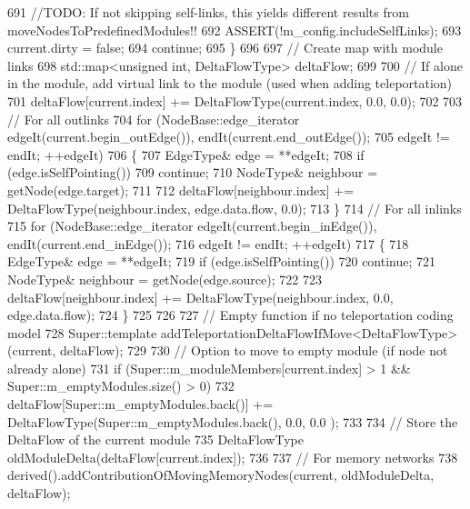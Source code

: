\begin{DoxyCode}
691             \textcolor{comment}{//TODO: If not skipping self-links, this yields different results from
       moveNodesToPredefinedModules!!}
692             ASSERT(!m\_config.includeSelfLinks);
693             current.dirty = \textcolor{keyword}{false};
694             \textcolor{keywordflow}{continue};
695         \}
696 
697         \textcolor{comment}{// Create map with module links}
698         std::map<unsigned int, DeltaFlowType> deltaFlow;
699 
700         \textcolor{comment}{// If alone in the module, add virtual link to the module (used when adding teleportation)}
701         deltaFlow[current.index] += DeltaFlowType(current.index, 0.0, 0.0);
702 
703         \textcolor{comment}{// For all outlinks}
704         \textcolor{keywordflow}{for} (NodeBase::edge\_iterator edgeIt(current.begin\_outEdge()), endIt(current.end\_outEdge());
705                 edgeIt != endIt; ++edgeIt)
706         \{
707             EdgeType& edge = **edgeIt;
708             \textcolor{keywordflow}{if} (edge.isSelfPointing())
709                 \textcolor{keywordflow}{continue};
710             NodeType& neighbour = getNode(edge.target);
711 
712             deltaFlow[neighbour.index] += DeltaFlowType(neighbour.index, edge.data.flow, 0.0);
713         \}
714         \textcolor{comment}{// For all inlinks}
715         \textcolor{keywordflow}{for} (NodeBase::edge\_iterator edgeIt(current.begin\_inEdge()), endIt(current.end\_inEdge());
716                 edgeIt != endIt; ++edgeIt)
717         \{
718             EdgeType& edge = **edgeIt;
719             \textcolor{keywordflow}{if} (edge.isSelfPointing())
720                 \textcolor{keywordflow}{continue};
721             NodeType& neighbour = getNode(edge.source);
722 
723             deltaFlow[neighbour.index] += DeltaFlowType(neighbour.index, 0.0, edge.data.flow);
724         \}
725 
726 
727         \textcolor{comment}{// Empty function if no teleportation coding model}
728         Super::template addTeleportationDeltaFlowIfMove<DeltaFlowType>(current, deltaFlow);
729 
730         \textcolor{comment}{// Option to move to empty module (if node not already alone)}
731         \textcolor{keywordflow}{if} (Super::m\_moduleMembers[current.index] > 1 && Super::m\_emptyModules.size() > 0)
732             deltaFlow[Super::m\_emptyModules.back()] += DeltaFlowType(Super::m\_emptyModules.back(), 0.0, 0.0
      );
733 
734         \textcolor{comment}{// Store the DeltaFlow of the current module}
735         DeltaFlowType oldModuleDelta(deltaFlow[current.index]);
736 
737         \textcolor{comment}{// For memory networks}
738         derived().addContributionOfMovingMemoryNodes(current, oldModuleDelta, deltaFlow);

\end{DoxyCode}
